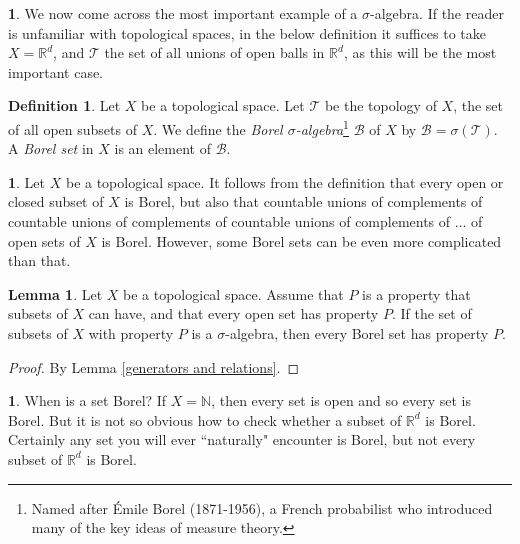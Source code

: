 \documentclass[12pt]{book}
\newcommand{\NN}{\mathbb{N}}
\newcommand{\RR}{\mathbb{R}}
\newcommand{\dfn}[1]{\emph{#1}\index{#1}}
\theoremstyle{definition}
\newtheorem{lemma}[theorem]{Lemma}
\newtheorem{subsec}[theorem]{}
\newtheorem{definition}[theorem]{Definition}
\begin{document}
\begin{subsec}
We now come across the most important example of a $\sigma$-algebra.
If the reader is unfamiliar with topological spaces, in the below definition it suffices to take $X = \RR^d$, and $\mathcal T$ the set of all unions of open balls in $\RR^d$, as this will be the most important case.
\end{subsec}

\begin{definition}
Let $X$ be a topological space.
Let $\mathcal T$ be the topology of $X$, the set of all open subsets of $X$.
We define the \dfn{Borel $\sigma$-algebra}\footnote{Named after Émile Borel (1871-1956), a French probabilist who introduced many of the key ideas of measure theory.}
$\mathcal B$ of $X$ by $\mathcal B = \sigma(\mathcal T)$.
A \dfn{Borel set} in $X$ is an element of $\mathcal B$.
\end{definition}

\begin{subsec}
Let $X$ be a topological space.
It follows from the definition that every open or closed subset of $X$ is Borel, but also that countable unions of complements of countable unions of complements of countable unions of complements of ... of open sets of $X$ is Borel.
However, some Borel sets can be even more complicated than that.
\end{subsec}

\begin{lemma}
Let $X$ be a topological space.
Assume that $P$ is a property that subsets of $X$ can have, and that every open set has property $P$.
If the set of subsets of $X$ with property $P$ is a $\sigma$-algebra, then every Borel set has property $P$.
\end{lemma}
\begin{proof}
By Lemma \ref{generators and relations}.
\end{proof}

\begin{subsec}
When is a set Borel? If $X = \NN$, then every set is open and so every set is Borel.
But it is not so obvious how to check whether a subset of $\RR^d$ is Borel.
Certainly any set you will ever ``naturally" encounter is Borel, but not every subset of $\RR^d$ is Borel.
\end{subsec}
\end{document}
